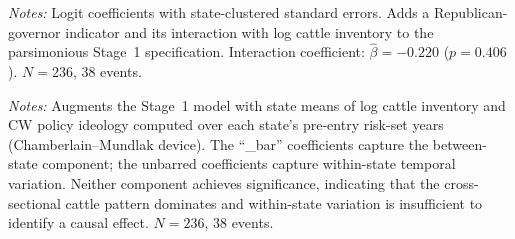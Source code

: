 \documentclass[12pt]{article}
\begin{document}
\begin{appendices}
\begin{table}[htbp]
\centering
\begin{threeparttable}
\caption{Stage 1: Cattle Exposure $\times$ Republican Governor Interaction}
\label{tab:cattle_x_govrepublican}

\begin{tablenotes}[flushleft]
\footnotesize
\item \textit{Notes:} Logit coefficients with state-clustered standard errors.  Adds a Republican-governor indicator and its interaction with log cattle inventory to the parsimonious Stage~1 specification.  Interaction coefficient: $\hat{\beta} = -0.220$ ($p = 0.406$).  $N = 236$, 38 events.
\end{tablenotes}
\end{threeparttable}
\end{table}

\begin{table}[htbp]
\centering
\begin{threeparttable}
\caption{Stage 1: Chamberlain--Mundlak Between/Within Decomposition}
\label{tab:mundlak}

\begin{tablenotes}[flushleft]
\footnotesize
\item \textit{Notes:} Augments the Stage~1 model with state means of log cattle inventory and CW policy ideology computed over each state's pre-entry risk-set years (Chamberlain--Mundlak device).  The ``\_bar'' coefficients capture the between-state component; the unbarred coefficients capture within-state temporal variation.  Neither component achieves significance, indicating that the cross-sectional cattle pattern dominates and within-state variation is insufficient to identify a causal effect.  $N = 236$, 38 events.
\end{tablenotes}
\end{threeparttable}
\end{table}


\end{appendices}
\end{document}

